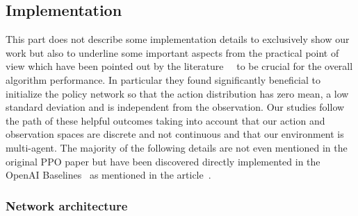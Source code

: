 \documentclass[11pt, a4paper, hidelinks]{report}
\begin{document}
\subsection{Implementation}\label{subsec:implementation}

This part does not describe some implementation details to exclusively show our work but also to underline some important aspects from the practical point of view which have been pointed out by the literature~\citep{ppo-implementation-1}~\citep{ppo-implementation-2} to be crucial for the overall algorithm performance.
In particular they found significantly beneficial to initialize the policy network so that the action distribution has zero mean, a low standard deviation and is independent from the observation.
Our studies follow the path of these helpful outcomes taking into account that our action and observation spaces are discrete and not continuous and that our environment is multi-agent.
The majority of the following details are not even mentioned in the original PPO paper but have been discovered directly implemented in the OpenAI Baselines~\citep{ppo-baselines} as mentioned in the article~\citep{ppo-32-implementations-details}.

\subsubsection{Network architecture}
\end{document}
